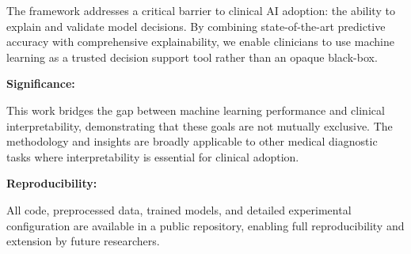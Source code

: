 \documentclass[journal]{IEEEtran}
\begin{document}
The framework addresses a critical barrier to clinical AI adoption: the ability to explain and validate model decisions. By combining state-of-the-art predictive accuracy with comprehensive explainability, we enable clinicians to use machine learning as a trusted decision support tool rather than an opaque black-box.

\textbf{Significance:}

This work bridges the gap between machine learning performance and clinical interpretability, demonstrating that these goals are not mutually exclusive. The methodology and insights are broadly applicable to other medical diagnostic tasks where interpretability is essential for clinical adoption.

\textbf{Reproducibility:}

All code, preprocessed data, trained models, and detailed experimental configuration are available in a public repository, enabling full reproducibility and extension by future researchers.
\end{document}
